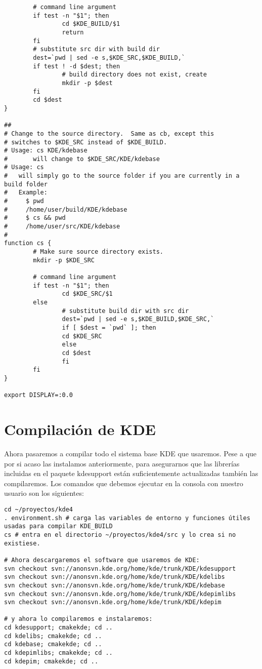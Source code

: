 \begin{verbatim}
        # command line argument
        if test -n "$1"; then
                cd $KDE_BUILD/$1
                return
        fi
        # substitute src dir with build dir
        dest=`pwd | sed -e s,$KDE_SRC,$KDE_BUILD,`
        if test ! -d $dest; then
                # build directory does not exist, create
                mkdir -p $dest
        fi
        cd $dest
}
 
##
# Change to the source directory.  Same as cb, except this
# switches to $KDE_SRC instead of $KDE_BUILD.
# Usage: cs KDE/kdebase
#       will change to $KDE_SRC/KDE/kdebase
# Usage: cs
#   will simply go to the source folder if you are currently in a build folder
#   Example:
#     $ pwd
#     /home/user/build/KDE/kdebase
#     $ cs && pwd
#     /home/user/src/KDE/kdebase
#
function cs {
        # Make sure source directory exists.
        mkdir -p $KDE_SRC
 
        # command line argument
        if test -n "$1"; then
                cd $KDE_SRC/$1
        else
                # substitute build dir with src dir
                dest=`pwd | sed -e s,$KDE_BUILD,$KDE_SRC,`
                if [ $dest = `pwd` ]; then
                cd $KDE_SRC
                else
                cd $dest
                fi
        fi
}
 
export DISPLAY=:0.0
\end{verbatim}

\section{Compilación de KDE}

Ahora pasaremos a compilar todo el sistema base KDE que usaremos. Pese a que por si acaso las instalamos anteriormente, para asegurarnos que las librerías incluidas en el paquete kdesupport están suficientemente actualizadas también las compilaremos. Los comandos que debemos ejecutar en la consola con nuestro usuario son los siguientes:

\begin{verbatim}
cd ~/proyectos/kde4
. environment.sh # carga las variables de entorno y funciones útiles usadas para compilar KDE_BUILD
cs # entra en el directorio ~/proyectos/kde4/src y lo crea si no existiese.

# Ahora descargaremos el software que usaremos de KDE:
svn checkout svn://anonsvn.kde.org/home/kde/trunk/KDE/kdesupport 
svn checkout svn://anonsvn.kde.org/home/kde/trunk/KDE/kdelibs
svn checkout svn://anonsvn.kde.org/home/kde/trunk/KDE/kdebase
svn checkout svn://anonsvn.kde.org/home/kde/trunk/KDE/kdepimlibs
svn checkout svn://anonsvn.kde.org/home/kde/trunk/KDE/kdepim

# y ahora lo compilaremos e instalaremos:
cd kdesupport; cmakekde; cd ..
cd kdelibs; cmakekde; cd ..
cd kdebase; cmakekde; cd ..
cd kdepimlibs; cmakekde; cd ..
cd kdepim; cmakekde; cd ..
\end{verbatim}

